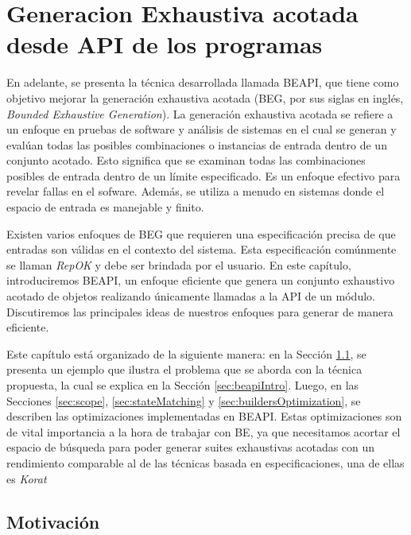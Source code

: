 \chapter{Generacion Exhaustiva acotada desde API de los programas}
\label{cap:beapi}

En adelante, se presenta la técnica desarrollada llamada BEAPI, que tiene como objetivo mejorar la generación exhaustiva acotada (BEG, por sus siglas en inglés, \emph{Bounded Exhaustive Generation}). 
La generación exhaustiva acotada se refiere a un enfoque en pruebas de software
y análisis de sistemas en el cual se generan y evalúan todas las posibles combinaciones o instancias de entrada dentro de un conjunto acotado. 
Esto significa que se examinan todas las combinaciones posibles de entrada dentro de un límite especificado. 
Es un enfoque efectivo para revelar fallas en el sofware. Además, se utiliza a menudo en sistemas donde el espacio de entrada es manejable y finito. 

Existen varios enfoques de BEG que requieren una especificación precisa de que entradas son válidas en el contexto del sistema. 
Esta especificación comúnmente se llaman \emph{RepOK} y debe ser brindada por el usuario.
En este capítulo, introduciremos BEAPI, un enfoque eficiente que genera un conjunto exhaustivo acotado de objetos realizando únicamente llamadas a la API de un módulo. 
Discutiremos las principales ideas de nuestros enfoques para generar de manera eficiente. 

Este capítulo está organizado de la siguiente manera: en la Sección \ref{sec:motivating-example}, 
se presenta un ejemplo que ilustra el problema que se aborda con la técnica propuesta, 
la cual se explica en la Sección \ref{sec:beapiIntro}. Luego, en las Secciones \ref{sec:scope}, \ref{sec:stateMatching} y
 \ref{sec:buildersOptimization}, se describen las optimizaciones implementadas en BEAPI. 
 Estas optimizaciones son de vital importancia a la hora de trabajar con BE, 
 ya que necesitamos acortar el espacio de búsqueda para poder generar suites exhaustivas acotadas con un 
 rendimiento comparable al de las técnicas basada en especificaciones, una de ellas es \emph{Korat}\cite{Boyapati02} 


\section[Motivación]{Motivación}
\label{sec:motivating-example}


